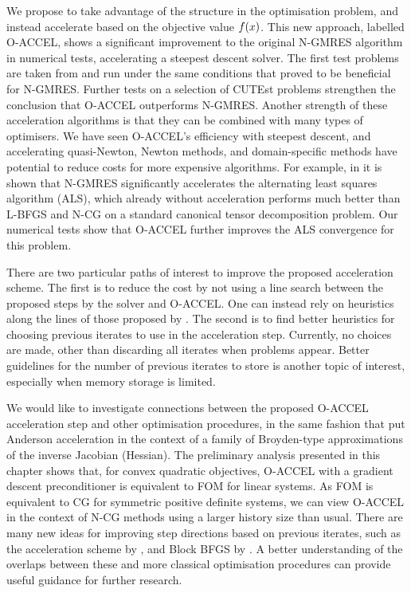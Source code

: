 \documentclass[main.tex]{subfiles}
\begin{document}
We propose to take advantage of the structure in the optimisation
problem, and instead accelerate based on the objective value
$f(x)$.  This new approach, labelled O-ACCEL, shows a significant
improvement to the original N-GMRES algorithm in numerical tests,
accelerating a steepest descent solver. The first test problems are
taken from \citet{sterck2013steepest} and run under the same
conditions that proved to be beneficial for N-GMRES.  Further tests on
a selection of CUTEst problems strengthen the conclusion that O-ACCEL
outperforms N-GMRES.  Another strength of these acceleration
algorithms is that they can be combined with many types of
optimisers. We have seen O-ACCEL's efficiency with steepest descent,
and accelerating quasi-Newton, Newton methods, and domain-specific
methods have potential to reduce costs for more expensive algorithms.
For example, in \citet{sterck2013steepest} it is shown that N-GMRES
significantly accelerates the alternating least squares algorithm
(ALS), which already without acceleration performs much better than
L-BFGS and N-CG on a standard canonical tensor decomposition
problem. Our numerical tests show that O-ACCEL further improves the
ALS convergence for this problem.

There are two particular paths of interest to improve the proposed
acceleration scheme. The first is to reduce the cost by not using a
line search between the proposed steps by the solver and O-ACCEL. One
can instead rely on heuristics along the lines of those proposed by
\citet{washio1997krylov}.  The second is to find better heuristics for
choosing previous iterates to use in the acceleration step. Currently,
no choices are made, other than discarding all iterates when problems
appear.  Better guidelines for the number of previous iterates to
store is another topic of interest, especially when memory storage is
limited.

We would like to investigate connections between the proposed O-ACCEL
acceleration step and other optimisation procedures, in the same
fashion that \citet{fang2009two} put Anderson acceleration in the
context of a family of Broyden-type approximations of the inverse
Jacobian (Hessian).  The preliminary analysis presented in this
chapter shows that, for convex quadratic objectives, O-ACCEL with a
gradient descent preconditioner is equivalent to FOM for linear
systems. As FOM is equivalent to CG for symmetric positive definite
systems, we can view O-ACCEL in the context of N-CG methods using a
larger history size than usual.  There are many new ideas for
improving step directions based on previous iterates, such as the
acceleration scheme by \citet{damien2016regularized}, and Block BFGS
by \citet{gao2016block}.  A better understanding of the overlaps
between these and more classical optimisation procedures can provide
useful guidance for further research.
\end{document}
